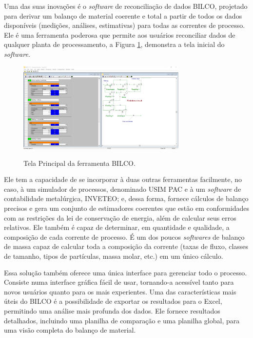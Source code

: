 Uma das suas inovações é o \textit{software} de reconciliação de dados BILCO, projetado para derivar um balanço de material coerente e total a partir de todos os dados disponíveis (medições, análises, estimativas) para todas as correntes de processo. Ele é uma ferramenta poderosa que permite aos usuários reconciliar dados de qualquer planta de processamento, a Figura \ref{fig:BILCO}, demonstra a tela inicial do \textit{software}.

\begin{figure}[htbp!] 
    \begin{center}
        \includegraphics[width=0.75\textwidth]{figuras/BILCOCASPEOP.png}
        \caption{Tela Principal da ferramenta BILCO.}
        \vspace{6mm}
        \label{fig:BILCO}
    \end{center} 
\end{figure}

Ele tem a capacidade de se incorporar à duas outras ferramentas facilmente, no caso, à um simulador de processos, denominado USIM PAC e à um \textit{software} de contabilidade metalúrgica, INVETEO; e, dessa forma, fornece cálculos de balanço precisos e gera um conjunto de estimadores coerentes que estão em conformidades com as restrições da lei de conservação de energia, além de calcular seus erros relativos. Ele também é capaz de determinar, em quantidade e qualidade, a composição de cada corrente de processo. É um dos poucos \textit{softwares} de balanço de massa capaz de calcular toda a composição da corrente (taxas de fluxo, classes de tamanho, tipos de partículas, massa molar, etc.) em um único cálculo.

Essa solução também oferece uma única interface para gerenciar todo o processo. Consiste numa interface gráfica fácil de usar, tornando-a acessível tanto para novos usuários quanto para os mais experientes. Uma das características mais úteis do BILCO é a possibilidade de exportar os resultados para o Excel, permitindo uma análise mais profunda dos dados. Ele fornece resultados detalhados, incluindo uma planilha de comparação e uma planilha global, para uma visão completa do balanço de material.

